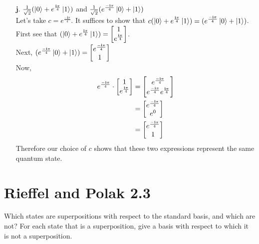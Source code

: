 \documentclass[11pt]{article}
\def\em{\ensuremath e^{\frac{-\textbf{i}\pi}{4}}}
\def\ep{\ensuremath e^{\frac{\textbf{i}\pi}{4}}}
\begin{document}
\begin{enumerate}
\newpage
\item[$\textbf{j.}$] 
	$\frac{1}{\sqrt{2}}(\ket{0} + \ep\ket{1})$ and
		$\frac{1}{\sqrt{2}}(\em\ket{0} + \ket{1})$ \\
	Let's take $c = e^{\frac{-\textbf{i}\pi}{4}}$.
	It suffices to show that $c(\ket{0} + \ep\ket{1}) = (\em\ket{0} + \ket{1})$.\\
	First see that $(\ket{0} + \ep\ket{1}) = \begin{bmatrix}1 \\ \ep\end{bmatrix}$.\\
		Next, $(\em\ket{0} + \ket{1}) = \begin{bmatrix}\em \\ 1\end{bmatrix}$
	\\ Now,
	\begin{align*}
		\em \cdot \begin{bmatrix}1 \\ \ep\end{bmatrix} 
			&= \begin{bmatrix}\em \\ \em\ep  \end{bmatrix} \\
			&= \begin{bmatrix}\em \\ e^0  \end{bmatrix}\\
			&= \begin{bmatrix}\em \\ 1  \end{bmatrix}
	\end{align*}
	Therefore our choice of $c$ shows that these two expressions represent the 
	same quantum state.
\end{enumerate}

\newpage
\section{Rieffel and Polak 2.3}
Which states are superpositions with respect to the standard basis, and which
are not? For each state that is a superposition, give a basis with respect to
which it is not a superposition.
\end{document}
